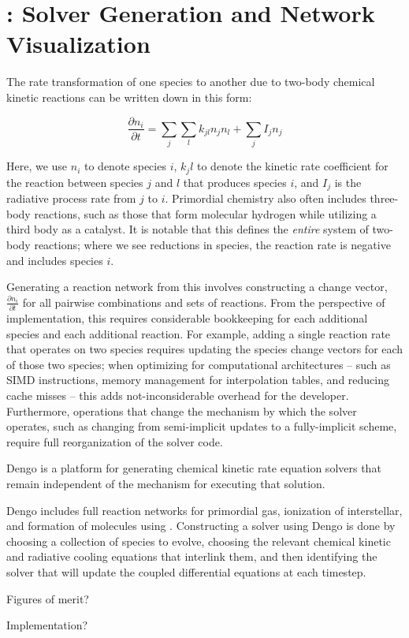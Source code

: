 \section{\dengo{}: Solver Generation and Network Visualization}



The rate transformation of one species to another due to two-body chemical kinetic
reactions can be written down in this form:

$$
\frac{\partial n_i }{\partial t} = \sum_{j}\sum_{l} k_{jl}n_{j}n_{l} + \sum_{j}I_{j}n_{j}
$$

Here, we use $n_{i}$ to denote species $i$, ${k_jl}$ to denote the kinetic rate
coefficient for the reaction between species $j$ and $l$ that produces species
$i$, and $I_{j}$ is the radiative process rate from $j$ to $i$.  Primordial
chemistry also often includes three-body reactions, such as those that
form molecular hydrogen while utilizing a third body as a catalyst.  It is
notable that this defines the \textit{entire} system of two-body reactions;
where we see reductions in species, the reaction rate is negative and includes
species ${i}$.


Generating a reaction network from this involves constructing a change vector,
$\frac{\partial n_i}{\partial t}$ for all pairwise combinations and sets of
reactions.  From the perspective of implementation, this requires considerable
bookkeeping for each additional species and each additional reaction.  For
example, adding a single reaction rate that operates on two species requires
updating the species change vectors for each of those two species; when
optimizing for computational architectures -- such as SIMD instructions, memory
management for interpolation tables, and reducing cache misses -- this adds
not-inconsiderable overhead for the developer.  Furthermore, operations that
change the mechanism by which the solver operates, such as changing from
semi-implicit updates to a fully-implicit scheme, require full reorganization
of the solver code.

Dengo is a platform for generating chemical kinetic rate equation solvers that
remain independent of the mechanism for executing that solution.


Dengo includes full reaction networks for primordial gas, ionization of
interstellar, and formation of molecules using .  Constructing a
solver using Dengo is done by choosing a collection of species to evolve,
choosing the relevant chemical kinetic and radiative cooling equations that
interlink them, and then identifying the solver that will update the coupled
differential equations at each timestep.



Figures of merit?

Implementation?
